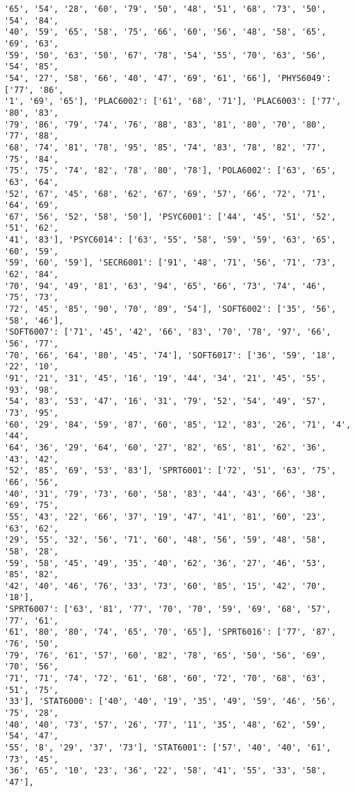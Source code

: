 \documentclass[11pt]{article}
\begin{document}
\begin{Verbatim}[commandchars=\\\{\}]
'65', '54', '28', '60', '79', '50', '48', '51', '68', '73', '50', '54', '84',
'40', '59', '65', '58', '75', '66', '60', '56', '48', '58', '65', '69', '63',
'59', '50', '63', '50', '67', '78', '54', '55', '70', '63', '56', '54', '85',
'54', '27', '58', '66', '40', '47', '69', '61', '66'], 'PHYS6049': ['77', '86',
'1', '69', '65'], 'PLAC6002': ['61', '68', '71'], 'PLAC6003': ['77', '80', '83',
'79', '86', '79', '74', '76', '88', '83', '81', '80', '70', '80', '77', '88',
'68', '74', '81', '78', '95', '85', '74', '83', '78', '82', '77', '75', '84',
'75', '75', '74', '82', '78', '80', '78'], 'POLA6002': ['63', '65', '63', '64',
'52', '67', '45', '68', '62', '67', '69', '57', '66', '72', '71', '64', '69',
'67', '56', '52', '58', '50'], 'PSYC6001': ['44', '45', '51', '52', '51', '62',
'41', '83'], 'PSYC6014': ['63', '55', '58', '59', '59', '63', '65', '60', '59',
'59', '60', '59'], 'SECR6001': ['91', '48', '71', '56', '71', '73', '62', '84',
'70', '94', '49', '81', '63', '94', '65', '66', '73', '74', '46', '75', '73',
'72', '45', '85', '90', '70', '89', '54'], 'SOFT6002': ['35', '56', '58', '46'],
'SOFT6007': ['71', '45', '42', '66', '83', '70', '78', '97', '66', '56', '77',
'70', '66', '64', '80', '45', '74'], 'SOFT6017': ['36', '59', '18', '22', '10',
'91', '21', '31', '45', '16', '19', '44', '34', '21', '45', '55', '93', '98',
'54', '83', '53', '47', '16', '31', '79', '52', '54', '49', '57', '73', '95',
'60', '29', '84', '59', '87', '60', '85', '12', '83', '26', '71', '4', '44',
'64', '36', '29', '64', '60', '27', '82', '65', '81', '62', '36', '43', '42',
'52', '85', '69', '53', '83'], 'SPRT6001': ['72', '51', '63', '75', '66', '56',
'40', '31', '79', '73', '60', '58', '83', '44', '43', '66', '38', '69', '75',
'55', '43', '22', '66', '37', '19', '47', '41', '81', '60', '23', '63', '62',
'29', '55', '32', '56', '71', '60', '48', '56', '59', '48', '58', '58', '28',
'59', '58', '45', '49', '35', '40', '62', '36', '27', '46', '53', '85', '82',
'42', '40', '46', '76', '33', '73', '60', '85', '15', '42', '70', '18'],
'SPRT6007': ['63', '81', '77', '70', '70', '59', '69', '68', '57', '77', '61',
'61', '80', '80', '74', '65', '70', '65'], 'SPRT6016': ['77', '87', '76', '50',
'79', '76', '61', '57', '60', '82', '78', '65', '50', '56', '69', '70', '56',
'71', '71', '74', '72', '61', '68', '60', '72', '70', '68', '63', '51', '75',
'33'], 'STAT6000': ['40', '40', '19', '35', '49', '59', '46', '56', '75', '28',
'40', '40', '73', '57', '26', '77', '11', '35', '48', '62', '59', '54', '47',
'55', '8', '29', '37', '73'], 'STAT6001': ['57', '40', '40', '61', '73', '45',
'36', '65', '10', '23', '36', '22', '58', '41', '55', '33', '58', '47'],

\end{Verbatim}
\end{document}
